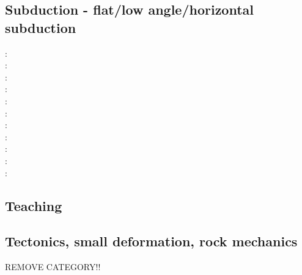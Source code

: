 \subsection{Subduction - flat/low angle/horizontal subduction}

\begin{scriptsize}
\twothousand: \cite{vavv00}\\
\twothousandone: \cite{vavv01}\\
\twothousandtwo: \cite{vavv02}\cite{vavv02b}\\
\twothousandfour: \cite{vavv04d}\\
\twothousandeight: \cite{pekh08}\cite{esfm08}\\
\twothousandeleven: \cite{cube11}\\
\twothousandtwelve: \cite{mapm12}\cite{ronb12}\\
\twothousandfifteen: \cite{gehm15}\cite{tarn15}\cite{ealw15}\\
\twothousandsixteen: \cite{chdf16}\cite{huwc16}\cite{hulh16}\\
\twothousandnineteen: \cite{sifg19}\cite{sams19b}\cite{malg19}\\
\twothousandtwenty: \cite{dawl20}
\end{scriptsize}

\subsection{Teaching} 

\begin{scriptsize}
\cite{grap11}
\cite{kerh14}
\cite{bemg19}
\end{scriptsize}

\subsection{Tectonics, small deformation, rock mechanics}
REMOVE CATEGORY!!
{\scriptsize
\cite{ilma93}
\cite{hept96}
}


